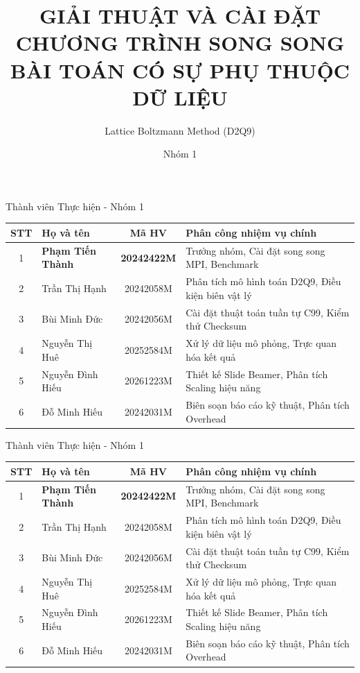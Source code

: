 \documentclass[t, aspectratio=169]{beamer}
\title{GIẢI THUẬT VÀ CÀI ĐẶT CHƯƠNG TRÌNH SONG SONG \\ BÀI TOÁN CÓ SỰ PHỤ THUỘC DỮ LIỆU}
\subtitle{Lattice Boltzmann Method (D2Q9)}
\author{Nhóm 1}
\institute{IT5408 - Tính toán Hiệu năng Cao}
\begin{document}
	
	\hustintropage{}
	\hustsectionpage{}
	
	
	
	\husttitlepage
	
	\begin{frame}{Thành viên Thực hiện - Nhóm 1}
		\begin{table}
			\centering
			\scriptsize
			\begin{tabular}{|c|l|c|p{6.8cm}|}
				\hline
				\textbf{STT} & \textbf{Họ và tên} & \textbf{Mã HV} & \textbf{Phân công nhiệm vụ chính} \\
				\hline
				1 & \textbf{Phạm Tiến Thành} & \textbf{20242422M} & Trưởng nhóm, Cài đặt song song MPI, Benchmark \\
				\hline
				2 & Trần Thị Hạnh & 20242058M & Phân tích mô hình toán D2Q9, Điều kiện biên vật lý \\
				\hline
				3 & Bùi Minh Đức & 20242056M & Cài đặt thuật toán tuần tự C99, Kiểm thử Checksum \\
				\hline
				4 & Nguyễn Thị Huê & 20252584M & Xử lý dữ liệu mô phỏng, Trực quan hóa kết quả \\
				\hline
				5 & Nguyễn Đình Hiếu & 20261223M & Thiết kế Slide Beamer, Phân tích Scaling hiệu năng \\
				\hline
				6 & Đỗ Minh Hiếu & 20242031M & Biên soạn báo cáo kỹ thuật, Phân tích Overhead \\
				\hline
			\end{tabular}
		\end{table}
	\end{frame}

	
	\begin{frame}{Thành viên Thực hiện - Nhóm 1}
		\begin{table}
			\centering
			\scriptsize
			\begin{tabular}{|c|l|c|p{6.8cm}|}
				\hline
				\textbf{STT} & \textbf{Họ và tên} & \textbf{Mã HV} & \textbf{Phân công nhiệm vụ chính} \\
				\hline
				1 & \textbf{Phạm Tiến Thành} & \textbf{20242422M} & Trưởng nhóm, Cài đặt song song MPI, Benchmark \\
				\hline
				2 & Trần Thị Hạnh & 20242058M & Phân tích mô hình toán D2Q9, Điều kiện biên vật lý \\
				\hline
				3 & Bùi Minh Đức & 20242056M & Cài đặt thuật toán tuần tự C99, Kiểm thử Checksum \\
				\hline
				4 & Nguyễn Thị Huê & 20252584M & Xử lý dữ liệu mô phỏng, Trực quan hóa kết quả \\
				\hline
				5 & Nguyễn Đình Hiếu & 20261223M & Thiết kế Slide Beamer, Phân tích Scaling hiệu năng \\
				\hline
				6 & Đỗ Minh Hiếu & 20242031M & Biên soạn báo cáo kỹ thuật, Phân tích Overhead \\
				\hline
			\end{tabular}
		\end{table}
	\end{frame}
\end{document}
